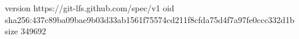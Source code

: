 version https://git-lfs.github.com/spec/v1
oid sha256:437c89ba09bae9b03d33ab1561f75574cd211f8cfda75d4f7a97fe0ccc332d1b
size 349692
